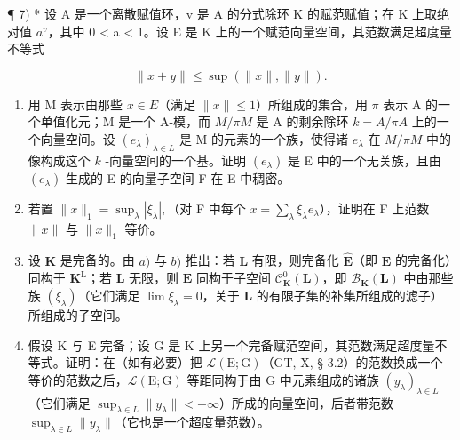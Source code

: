 ¶ 7) * 设 A 是一个离散赋值环，v 是 A 的分式除环 K 的赋范赋值；在 K 上取绝对值 \(a^{v}\)，其中 0 \textless{} a \textless{} 1。设 E 是 K 上的一个赋范向量空间，其范数满足超度量不等式

\[
\| x + y \| \leqslant \sup (\| x \|, \| y \|).
\]

\begin{enumerate}
\def\labelenumi{\alph{enumi})}
\item
  用 M 表示由那些 \(x \in E\)（满足 \(\| x \| \leqslant 1\)）所组成的集合，用 \(\pi\) 表示 A 的一个单值化元；M 是一个 A-模，而 \(M / \pi M\) 是 A 的剩余除环 \(k = A / \pi A\) 上的一个向量空间。设 \((e_{\lambda})_{\lambda \in L}\) 是 M 的元素的一个族，使得诸 \(e_{\lambda}\) 在 \(M / \pi M\) 中的像构成这个 \(k\) -向量空间的一个基。证明 \((e_{\lambda})\) 是 E 中的一个无关族，且由 \((e_{\lambda})\) 生成的 E 的向量子空间 F 在 E 中稠密。
\item
  若置 \(\| x\| _1 = \sup_{\lambda}|\xi_\lambda |,\)（对 F 中每个 \(x = \sum_{\lambda}\xi_{\lambda}e_{\lambda}\)），证明在 F 上范数 \(\| x\|\) 与 \(\| x\| _1\) 等价。
\item
  设 \(\mathbf{K}\) 是完备的。由 \(a)\) 与 \(b)\) 推出：若 \(\mathbf{L}\) 有限，则完备化 \(\hat{\mathbf{E}}\)（即 \(\mathbf{E}\) 的完备化）同构于 \(\mathbf{K}^{\mathrm{L}}\)；若 \(\mathbf{L}\) 无限，则 \(\hat{\mathbf{E}}\) 同构于子空间 \(\mathcal{C}_{\mathbf{K}}^{0}(\mathbf{L})\)，即 \(\mathcal{B}_{\mathbf{K}}(\mathbf{L})\) 中由那些族 \((\xi_{\lambda})\)（它们满足 \(\lim \xi_{\lambda} = 0\)，关于 \(\mathbf{L}\) 的有限子集的补集所组成的滤子）所组成的子空间。
\item
  假设 K 与 E 完备；设 G 是 K 上另一个完备赋范空间，其范数满足超度量不等式。证明：在（如有必要）把 \(\mathcal{L}(\mathrm{E};\mathrm{G})\)（GT, X, § 3.2）的范数换成一个等价的范数之后，\(\mathcal{L}(\mathrm{E};\mathrm{G})\) 等距同构于由 G 中元素组成的诸族 \((y_{\lambda})_{\lambda \in L}\)（它们满足 \(\sup_{\lambda \in L}\| y_{\lambda}\| < +\infty\)）所成的向量空间，后者带范数 \(\sup_{\lambda \in L}\| y_{\lambda}\|\)（它也是一个超度量范数）。
\end{enumerate}

